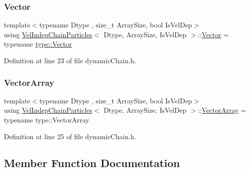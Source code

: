 \subsubsection{\texorpdfstring{Vector}{Vector}}
{\footnotesize\ttfamily template$<$typename Dtype , size\+\_\+t Array\+Size, bool Is\+Vel\+Dep$>$ \\
using \mbox{\hyperlink{class_vel_indep_chain_particles}{Vel\+Indep\+Chain\+Particles}}$<$ Dtype, Array\+Size, Is\+Vel\+Dep $>$\+::\mbox{\hyperlink{class_vel_indep_particles_aa7e03da81f44941c06abf43ec2180079}{Vector}} =  typename \mbox{\hyperlink{struct_space_h_1_1_proto_type_a316b81f4660b2b4fab14a8e1f23b6089}{type\+::\+Vector}}}



Definition at line 23 of file dynamic\+Chain.\+h.

\mbox{\label{class_vel_indep_chain_particles_a5558cddeaa7eab94920bdfbeffaa432b}} 
\subsubsection{\texorpdfstring{Vector\+Array}{VectorArray}}
{\footnotesize\ttfamily template$<$typename Dtype , size\+\_\+t Array\+Size, bool Is\+Vel\+Dep$>$ \\
using \mbox{\hyperlink{class_vel_indep_chain_particles}{Vel\+Indep\+Chain\+Particles}}$<$ Dtype, Array\+Size, Is\+Vel\+Dep $>$\+::\mbox{\hyperlink{class_vel_indep_particles_a27580f65b6523bfb6900520af2e44708}{Vector\+Array}} =  typename type\+::\+Vector\+Array}



Definition at line 25 of file dynamic\+Chain.\+h.



\subsection{Member Function Documentation}
\mbox{\label{class_vel_indep_chain_particles_a76124f26a1e37892cd38f533edcbb8e8}} 
